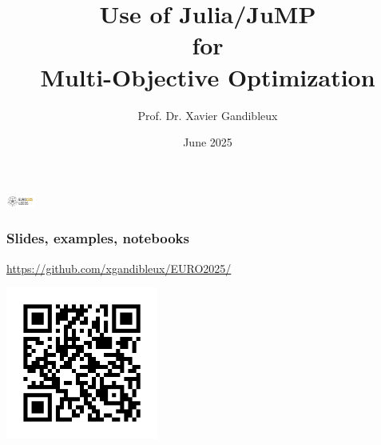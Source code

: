 \documentclass[]{beamer}
\title[Julia]{{\textbf{\LARGE{Use of Julia/JuMP \\ for \\ Multi-Objective Optimization}}}}
\date{June 2025}
\author{Prof. Dr. Xavier Gandibleux \vspace{-3mm}}
\institute{Nantes Université, France}
\begin{document}
% 
%

\begin{frame}
  \titlepage
  \vspace{-1cm}
\end{frame}


{ 
  \hfill \includegraphics[height=0.4cm]{logoEuro2025.png} \hfill
{}
\vskip4pt%
}



% 
%
\begin{frame}[fragile]
  \frametitle{Slides, examples, notebooks}
 \vspace{2mm}

\centerline{\url{https://github.com/xgandibleux/EURO2025/}}

\centerline{\includegraphics[width=5cm]{qrcode.png}}


\end{frame}
% 
%
\end{document}
